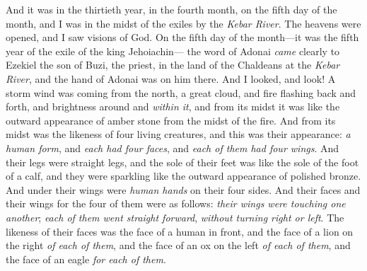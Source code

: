 
\begin{biblechapter} %
 And it was in the thirtieth year, in the fourth month, on the fifth day of the month, and I was in the midst of the exiles by the \textit{Kebar River}. The heavens were opened, and I saw visions of God.
\verse On the fifth day of the month—it was the fifth year of the exile of the king Jehoiachin—
\verse the word of Adonai \textit{came} clearly to Ezekiel the son of Buzi, the priest, in the land of the Chaldeans at the \textit{Kebar River}, and the hand of Adonai was on him there.
\verse And I looked, and look! A storm wind was coming from the north, a great cloud, and fire flashing back and forth, and brightness around and \textit{within it}, and from its midst it was like the outward appearance of amber stone from the midst of the fire.
\verse And from its midst was the likeness of four living creatures, and this was their appearance: \textit{a human form},
\verse and \textit{each had four faces}, and \textit{each of them had four wings}.
\verse And their legs were straight legs, and the sole of their feet was like the sole of the foot of a calf, and they were sparkling like the outward appearance of polished bronze.
\verse And under their wings were \textit{human hands} on their four sides. And their faces and their wings for the four of them were as follows:
\verse \textit{their wings were touching one another}; \textit{each of them went straight forward}, \textit{without turning right or left}.
\verse The likeness of their faces was the face of a human in front, and the face of a lion on the right \textit{of each of them}, and the face of an ox on the left \textit{of each of them}, and the face of an eagle \textit{for each of them}.

\end{biblechapter}
